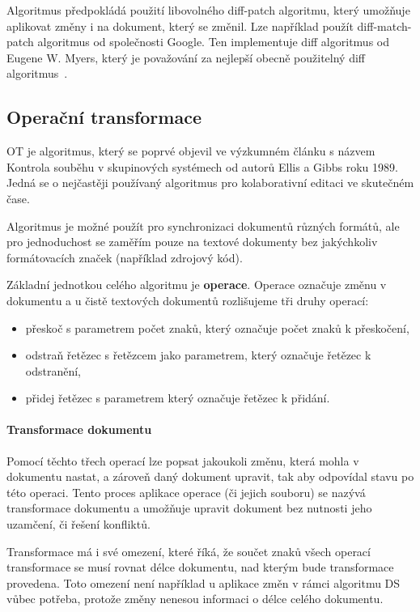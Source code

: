 Algoritmus předpokládá použití libovolného diff-patch algoritmu, který umožňuje aplikovat změny i na dokument, který se změnil.
Lze například použít diff-match-patch algoritmus od společnosti Google.
Ten implementuje diff algoritmus od Eugene W. Myers, který je považování za nejlepší obecně použitelný diff algoritmus~\cite{ds:myers_diff}.~\cite{ds:neil_paper}~\cite{ds:neil_video}

\subsection{Operační transformace}\label{subsec:operacniTransformace}

\gls{OT} je algoritmus, který se poprvé objevil ve výzkumném článku s názvem Kontrola souběhu v skupinových systémech od autorů Ellis a Gibbs roku 1989.
Jedná se o nejčastěji používaný algoritmus pro kolaborativní editaci ve skutečném čase.~\cite{ot:intro}

Algoritmus je možné použít pro synchronizaci dokumentů různých formátů, ale pro jednoduchost se zaměřím pouze na textové dokumenty bez jakýchkoliv formátovacích značek (například zdrojový kód).

Základní jednotkou celého algoritmu je \textbf{operace}.
Operace označuje změnu v dokumentu a u čistě textových dokumentů rozlišujeme tři druhy operací:
\begin{itemize}
    \item přeskoč s parametrem počet znaků, který označuje počet znaků k přeskočení,
    \item odstraň řetězec s řetězcem jako parametrem, který označuje řetězec k odstranění,
    \item přidej řetězec s parametrem který označuje řetězec k přidání.~\cite{ot:aboutOT}
\end{itemize}

\paragraph{Transformace dokumentu}
Pomocí těchto třech operací lze popsat jakoukoli změnu, která mohla v dokumentu nastat, a zároveň daný dokument upravit, tak aby odpovídal stavu po této operaci.
Tento proces aplikace operace (či jejich souboru) se nazývá transformace dokumentu a umožňuje upravit dokument bez nutnosti jeho uzamčení, či řešení konfliktů.

Transformace má i své omezení, které říká, že součet znaků všech operací transformace se musí rovnat délce dokumentu, nad kterým bude transformace provedena.
Toto omezení není například u aplikace změn v rámci algoritmu \gls{DS} vůbec potřeba, protože změny nenesou informaci o délce celého dokumentu.

